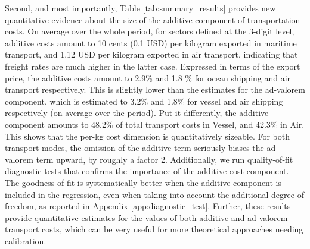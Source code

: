 \documentclass[a4paper,11pt]{article}
\begin{document}
Second, and most importantly, Table \ref{tab:summary_results} provides new quantitative evidence about the size of the additive component of transportation costs. On average over the whole period, for sectors defined at the 3-digit level, additive costs amount to 10 cents (0.1 USD) per kilogram exported in maritime transport, and 1.12 USD per kilogram exported in air transport, indicating that freight rates are much higher in the latter case. Expressed in terms of the export price, the additive costs amount to 2.9\% and 1.8 \% for ocean shipping and air transport respectively. This is slightly lower than the estimates for the ad-valorem component, which is estimated to 3.2\% and 1.8\% for vessel and air shipping respectively (on average over the period). Put it differently, the additive component amounts to 48.2\% of total transport costs in Vessel, and 42.3\% in Air. This shows that the per-kg cost dimension is quantitatively sizeable. For both transport modes, the omission of the additive term seriously biases the ad-valorem term upward, by roughly a factor 2. Additionally, we run quality-of-fit diagnostic tests that confirms the importance of the additive cost component. The goodness of fit is systematically better when the additive component is included in the regression, even when taking into account the additional degree of freedom, as reported in Appendix \ref{app:diagnostic_test}. Further, these results provide quantitative estimates for the values of both additive and ad-valorem transport costs, which can be very useful for more theoretical approaches needing calibration.\smallskip
\end{document}
